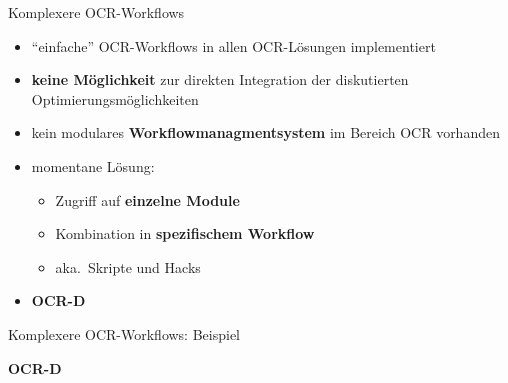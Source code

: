 \documentclass{bbawslides}
\begin{document}
\begin{bbawslide}{Komplexere OCR-Workflows}
  \vspace*{7mm}%
  \centerslidestrue%
  \begin{itemize}
    \item \enquote{einfache} OCR-Workflows in allen OCR-Lösungen implementiert
    \item \textbf{keine Möglichkeit} zur direkten Integration der diskutierten Optimierungsmöglichkeiten
    \item kein modulares \textbf{Workflowmanagmentsystem} im Bereich OCR vorhanden
    \item momentane Lösung:
    \begin{itemize}
       \item Zugriff auf \textbf{einzelne Module}
       \item Kombination in \textbf{spezifischem Workflow}
       \item aka.~Skripte und Hacks
    \end{itemize}
    \item \textbf{OCR-D}
  \end{itemize}
\end{bbawslide}

\begin{bbawslide}{Komplexere OCR-Workflows: Beispiel}
  \vspace*{2mm}%
  \begin{center}
  \end{center}
\end{bbawslide}

\begin{bbawpart}{\Large\bf OCR-D}
\end{bbawpart}
\end{document}
